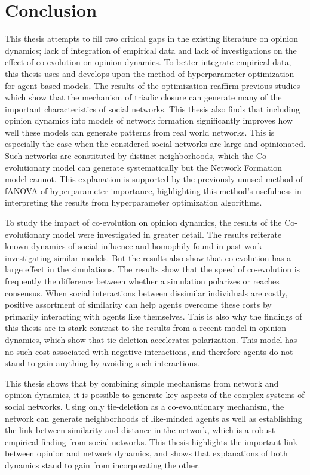 \documentclass[11pt]{article}
\begin{document}
\section{Conclusion}
This thesis attempts to fill two critical gaps in the existing literature on opinion dynamics; lack of integration of empirical data and lack of investigations on the effect of co-evolution on opinion dynamics. To better integrate empirical data, this thesis uses and develops upon the method of hyperparameter optimization for agent-based models. The results of the optimization reaffirm previous studies which show that the mechanism of triadic closure can generate many of the important characteristics of social networks. This thesis also finds that including opinion dynamics into models of network formation significantly improves how well these models can generate patterns from real world networks. This is especially the case when the considered social networks are large and opinionated. Such networks are constituted by distinct neighborhoods, which the Co-evolutionary model can generate systematically but the Network Formation model cannot. This explanation is supported by the previously unused method of fANOVA of hyperparameter importance, highlighting this method's usefulness in interpreting the results from hyperparameter optimization algorithms.

\noindent To study the impact of co-evolution on opinion dynamics, the results of the Co-evolutionary model were investigated in greater detail. The results reiterate known dynamics of social influence and homophily found in past work investigating similar models. But the results also show that co-evolution has a large effect in the simulations. The results show that the speed of co-evolution is frequently the difference between whether a simulation polarizes or reaches consensus. When social interactions between dissimilar individuals are costly, positive assortment of similarity can help agents overcome these costs by primarily interacting with agents like themselves. This is also why the findings of this thesis are in stark contrast to the results from a recent model in opinion dynamics, which show that tie-deletion accelerates polarization. This model has no such cost associated with negative interactions, and therefore agents do not stand to gain anything by avoiding such interactions. 

\noindent This thesis shows that by combining simple mechanisms from network and opinion dynamics, it is possible to generate key aspects of the complex systems of social networks. Using only tie-deletion as a co-evolutionary mechanism, the network can generate neighborhoods of like-minded agents as well as establishing the link between similarity and distance in the network, which is a robust empirical finding from social networks.
This thesis highlights the important link between opinion and network dynamics, and shows that explanations of both dynamics stand to gain from incorporating the other. 
\end{document}
